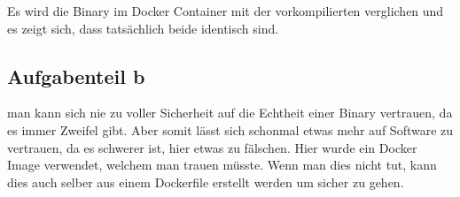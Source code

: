 \documentclass[a4paper,12pt,
headsepline,           %
oneside,               %
pointlessnumbers,      %
bibtotoc,              %
BCOR15mm               %
]{scrbook}
\begin{document}
Es wird die Binary im Docker Container mit der vorkompilierten verglichen und es zeigt sich, dass tatsächlich beide identisch sind.

\subsection*{Aufgabenteil b}
man kann sich nie zu voller Sicherheit auf die Echtheit einer Binary vertrauen, da es immer Zweifel gibt. Aber somit lässt sich schonmal etwas mehr auf Software zu vertrauen, da es schwerer ist, hier etwas zu fälschen. Hier wurde ein Docker Image verwendet, welchem man trauen müsste. Wenn man dies nicht tut, kann dies auch selber aus einem Dockerfile erstellt werden um sicher zu gehen.
\end{document}
